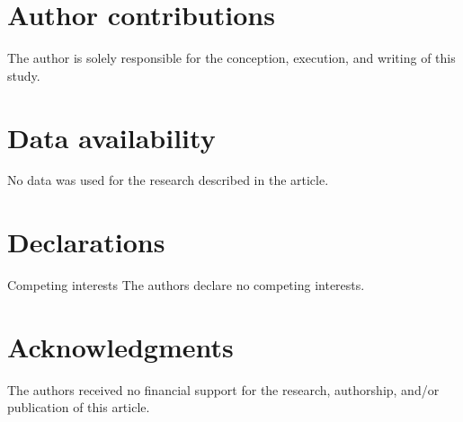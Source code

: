 \documentclass[pdflatex,sn-mathphys-num]{sn-jnl}
\theoremstyle{thmstyleone}
\theoremstyle{thmstyletwo}
\theoremstyle{thmstylethree}
\begin{document}
	
	\section*{Author contributions}
	The author is solely responsible for the conception, execution, and writing of this
	study.
	\section*{Data availability}
	No data was used for the research described in the article.
	\section*{Declarations}
	Competing interests The authors declare no competing interests.
	
	
	\section*{Acknowledgments}
	The authors received no financial support for the research, authorship, and/or publication of this article.
	
	
\end{document}
